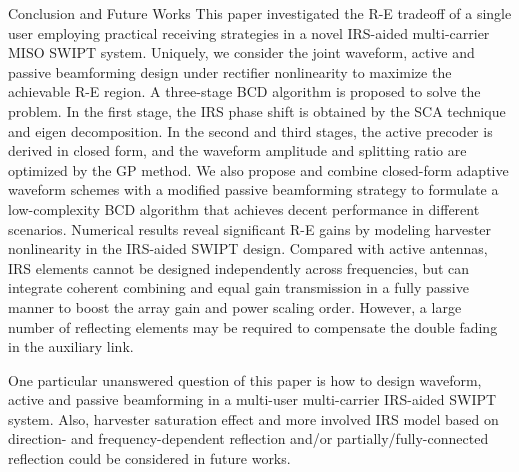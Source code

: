 \documentclass[journal]{IEEEtran}
\begin{document}
	\begin{section}{Conclusion and Future Works}\label{se:conclusion_and_future_works}
		This paper investigated the R-E tradeoff of a single user employing practical receiving strategies in a novel IRS-aided multi-carrier MISO SWIPT system. Uniquely, we consider the joint waveform, active and passive beamforming design under rectifier nonlinearity to maximize the achievable R-E region. A three-stage BCD algorithm is proposed to solve the problem. In the first stage, the IRS phase shift is obtained by the SCA technique and eigen decomposition. In the second and third stages, the active precoder is derived in closed form, and the waveform amplitude and splitting ratio are optimized by the GP method. We also propose and combine closed-form adaptive waveform schemes with a modified passive beamforming strategy to formulate a low-complexity BCD algorithm that achieves decent performance in different scenarios. Numerical results reveal significant R-E gains by modeling harvester nonlinearity in the IRS-aided SWIPT design. Compared with active antennas, IRS elements cannot be designed independently across frequencies, but can integrate coherent combining and equal gain transmission in a fully passive manner to boost the array gain and power scaling order. However, a large number of reflecting elements may be required to compensate the double fading in the auxiliary link.

        One particular unanswered question of this paper is how to design waveform, active and passive beamforming in a multi-user multi-carrier IRS-aided SWIPT system. Also, harvester saturation effect and more involved IRS model based on direction- and frequency-dependent reflection \cite{Abeywickrama2020} and/or partially/fully-connected reflection \cite{Shen2020a} could be considered in future works.
	\end{section}
\end{document}
